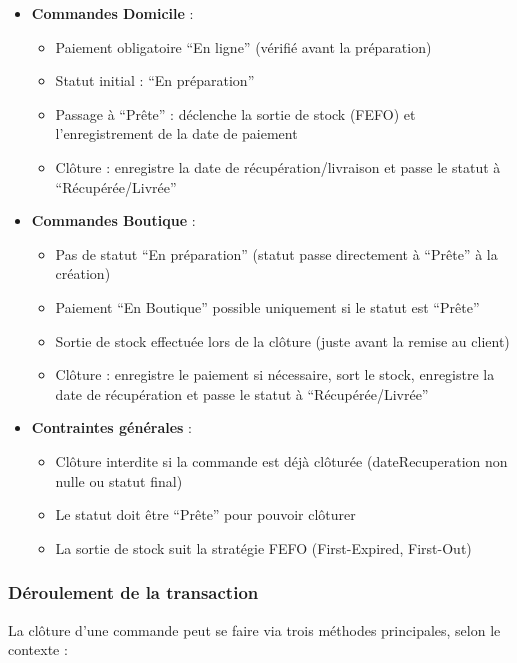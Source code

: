 \begin{itemize}
    \item \textbf{Commandes Domicile} :
    \begin{itemize}
        \item Paiement obligatoire ``En ligne'' (vérifié avant la préparation)
        \item Statut initial : ``En préparation''
        \item Passage à ``Prête'' : déclenche la sortie de stock (FEFO) et l'enregistrement de la date de paiement
        \item Clôture : enregistre la date de récupération/livraison et passe le statut à ``Récupérée/Livrée''
    \end{itemize}
    
    \item \textbf{Commandes Boutique} :
    \begin{itemize}
        \item Pas de statut ``En préparation'' (statut passe directement à ``Prête'' à la création)
        \item Paiement ``En Boutique'' possible uniquement si le statut est ``Prête''
        \item Sortie de stock effectuée lors de la clôture (juste avant la remise au client)
        \item Clôture : enregistre le paiement si nécessaire, sort le stock, enregistre la date de récupération et passe le statut à ``Récupérée/Livrée''
    \end{itemize}
    
    \item \textbf{Contraintes générales} :
    \begin{itemize}
        \item Clôture interdite si la commande est déjà clôturée (dateRecuperation non nulle ou statut final)
        \item Le statut doit être ``Prête'' pour pouvoir clôturer
        \item La sortie de stock suit la stratégie FEFO (First-Expired, First-Out)
    \end{itemize}
\end{itemize}

\subsubsection{Déroulement de la transaction}

La clôture d'une commande peut se faire via trois méthodes principales, selon le contexte :

